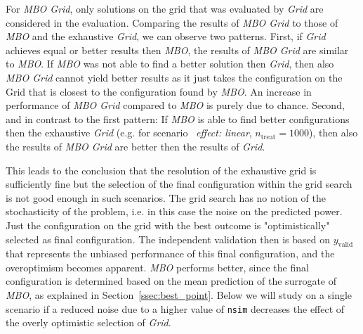 \documentclass[bimj,fleqn]{w-art}
\theoremstyle{plain}
\theoremstyle{definition}
\begin{document}
For \emph{MBO Grid}, only solutions on the grid that was evaluated by \emph{Grid} are considered in the evaluation. 
Comparing the results of \emph{MBO Grid} to those of \emph{MBO} and the exhaustive \emph{Grid}, we can observe two patterns.
First, if \emph{Grid} achieves equal or better results then \emph{MBO}, the results of \emph{MBO Grid} are similar to \emph{MBO}. 
If \emph{MBO} was not able to find a better solution then \emph{Grid}, then also \emph{MBO Grid} cannot yield better results as it just takes the configuration on the Grid that is closest to the configuration found by \emph{MBO}.
An increase in performance of \emph{MBO Grid} compared to \emph{MBO} is purely due to chance.
Second, and in contrast to the first pattern: 
If \emph{MBO} is able to find better configurations then the exhaustive \emph{Grid} (e.g. for scenario \ \emph{effect: linear}, $n_{\text{treat}} = 1000$), then also the results of \emph{MBO Grid} are better then the results of \emph{Grid}.

This leads to the conclusion that the resolution of the exhaustive grid is sufficiently fine but the selection of the final configuration within the grid search is not good enough in such scenarios.
The grid search has no notion of the stochasticity of the problem, i.e. in this case the noise on the predicted power. 
Just the configuration on the grid with the best outcome is "optimistically" selected as final configuration.
The independent validation then is based on $y_{\text{valid}}$ that represents the unbiased performance of this final configuration, and the overoptimism becomes apparent.
\emph{MBO} performs better, since the final configuration is determined based on the mean prediction of the surrogate of \emph{MBO}, as explained in Section~\ref{ssec:best_point}.
Below we will study on a single scenario if a reduced noise due to a higher value of \texttt{nsim} decreases the effect of the overly optimistic selection of \emph{Grid}. %
\end{document}
